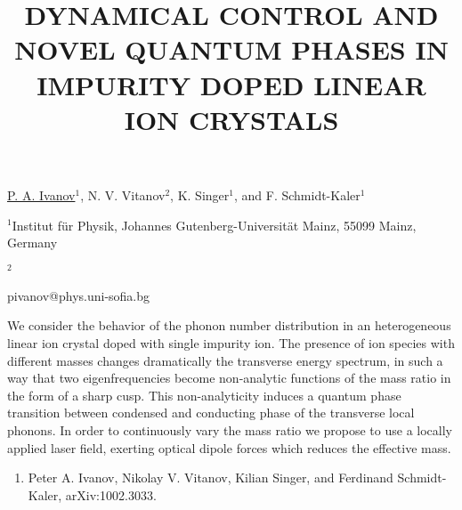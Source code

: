 \title{DYNAMICAL CONTROL AND NOVEL QUANTUM PHASES IN IMPURITY DOPED LINEAR ION CRYSTALS}

\underline{P. A. Ivanov}$^{1}$, N. V. Vitanov$^{2}$, K. Singer$^{1}$, and F. Schmidt-Kaler$^{1}$

{\normalsize{

\vspace{-4mm} $^1$Institut f\"ur Physik, Johannes
Gutenberg-Universit\"at Mainz, 55099 Mainz, Germany

\vspace{-4mm} $^2$\unisofia

\email pivanov@phys.uni-sofia.bg}}

We consider the behavior of the phonon number distribution in an
heterogeneous linear ion crystal doped with single impurity ion.
The presence of ion species with different masses changes
dramatically the transverse energy spectrum, in such a way that
two eigenfrequencies become non-analytic functions of the mass
ratio in the form of a sharp cusp. This non-analyticity induces a
quantum phase transition between condensed and conducting phase of
the transverse local phonons. In order to continuously vary the
mass ratio we propose to use a locally applied laser field,
exerting optical dipole forces which reduces the effective mass.

\begin{enumerate}
\item Peter A. Ivanov, Nikolay V. Vitanov, Kilian Singer, and Ferdinand Schmidt-Kaler, arXiv:1002.3033.
\end{enumerate}

\vspace{\baselineskip}

